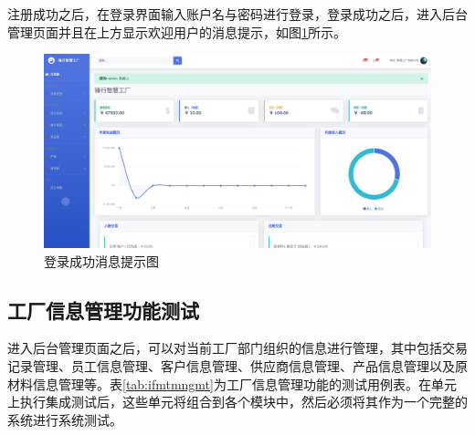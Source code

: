注册成功之后，在登录界面输入账户名与密码进行登录，登录成功之后，进入后台管理页面并且在上方显示欢迎用户的消息提示，如图\ref{fig:lgsccs}所示。

\begin{figure}[H]
    \centering
    \includegraphics[width=.75\textwidth]{figures/6loginsuscess.png}
    \caption{登录成功消息提示图}
    \label{fig:lgsccs}
\end{figure}

\subsection{工厂信息管理功能测试}

进入后台管理页面之后，可以对当前工厂部门组织的信息进行管理，其中包括交易记录管理、员工信息管理、客户信息管理、供应商信息管理、产品信息管理以及原材料信息管理等。表\ref{tab:ifmtmngmt}为工厂信息管理功能的测试用例表。在单元上执行集成测试后，这些单元将组合到各个模块中，然后必须将其作为一个完整的系统进行系统测试。


